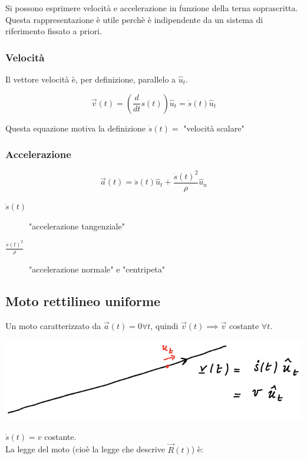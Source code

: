 \documentclass{article}
\begin{document}
\noindent
Si possono esprimere velocità e accelerazione in funzione della terna soprascritta.
Questa rappresentazione è utile perchè è indipendente da un sistema di riferimento fissato a priori.

\subsubsection{Velocità}

Il vettore velocità è, per definizione, parallelo a $\hat{u}_t$.

$$
\vec{v}(t) = (\frac{d}{dt} s(t)) \hat{u}_t = \dot{s}(t)\hat{u}_t
$$

\noindent
Questa equazione motiva la definizione $\dot{s}(t) =$ "velocità scalare"

\subsubsection{Accelerazione}

$$
\vec{a}(t) = \ddot{s}(t)\hat{u}_t + \frac{\dot{s}(t)^2}{\rho}\hat{u}_n
$$

\begin{description}
    \item[$\ddot{s}(t)$] "accelerazione tangenziale"
    \item[$\frac{\dot{s}(t)^2}{\rho}$] "accelerazione normale" e "centripeta"
\end{description}

\subsection{Moto rettilineo uniforme}

Un moto caratterizzato da $\vec{a}(t) = 0 \forall t$, quindi $\vec{v}(t) \implies \vec{v}$ costante $\forall t$.

\includegraphics[width=\columnwidth]{esempio-moto-rettilineo-uniforme}

\noindent
$\dot{s}(t) = v$ costante.\\

\noindent
La legge del moto (cioè la legge che descrive $\vec{R}(t)$) è:
\end{document}
